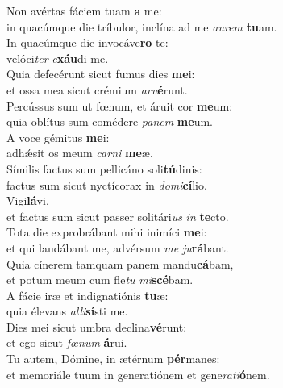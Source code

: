 \evenverse Non avértas fáciem tuam \textbf{a} me:~\*\\
\evenverse in quacúmque die tríbulor, inclína ad me \textit{au}\textit{rem} \textbf{tu}am.\\
\oddverse In quacúmque die invocáve\textbf{ro} te:~\*\\
\oddverse velóci\textit{ter} \textit{e}\textbf{xáu}di me.\\
\evenverse Quia defecérunt sicut fumus dies \textbf{me}i:~\*\\
\evenverse et ossa mea sicut crémium \textit{a}\textit{ru}\textbf{é}runt.\\
\oddverse Percússus sum ut fœnum, et áruit cor \textbf{me}um:~\*\\
\oddverse quia oblítus sum comédere \textit{pa}\textit{nem} \textbf{me}um.\\
\evenverse A voce gémitus \textbf{me}i:~\*\\
\evenverse adhǽsit os meum \textit{car}\textit{ni} \textbf{me}æ.\\
\oddverse Símilis factus sum pellicáno soli\textbf{tú}dinis:~\*\\
\oddverse factus sum sicut nyctícorax in \textit{do}\textit{mi}\textbf{cí}lio.\\
\evenverse Vigi\textbf{lá}vi,~\*\\
\evenverse et factus sum sicut passer solitári\textit{us} \textit{in} \textbf{te}cto.\\
\oddverse Tota die exprobrábant mihi inimíci \textbf{me}i:~\*\\
\oddverse et qui laudábant me, advérsum \textit{me} \textit{ju}\textbf{rá}bant.\\
\evenverse Quia cínerem tamquam panem mandu\textbf{cá}bam,~\*\\
\evenverse et potum meum cum fle\textit{tu} \textit{mi}\textbf{scé}bam.\\
\oddverse A fácie iræ et indignatiónis \textbf{tu}æ:~\*\\
\oddverse quia élevans \textit{al}\textit{li}\textbf{sí}sti me.\\
\evenverse Dies mei sicut umbra declina\textbf{vé}runt:~\*\\
\evenverse et ego sicut \textit{fœ}\textit{num} \textbf{á}rui.\\
\oddverse Tu autem, Dómine, in ætérnum \textbf{pér}manes:~\*\\
\oddverse et memoriále tuum in generatiónem et gene\textit{ra}\textit{ti}\textbf{ó}nem.\\
